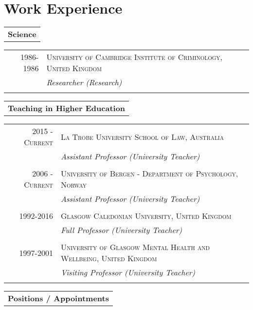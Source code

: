 \documentclass [a4paper,10pt]{article}
\begin{document}
\section{Work Experience}
\begin{tabular}{r}
\\\large
\textbf{Science}
\normalsize
\end{tabular}

\begin{tabular}{r|p{11cm}} 
\textsc{1986-1986} 
& \textsc{University of Cambridge Institute of Criminology, United Kingdom} \\ \textsc{} & \emph{Researcher (Research)}  \\ \multicolumn{2}{c}{} \\
\end{tabular}

\begin{tabular}{r}
\large
\textbf{Teaching in Higher Education}
\normalsize
\end{tabular}

\begin{tabular}{r|p{11cm}} 
\textsc{2015 - Current} 
& \textsc{La Trobe University School of Law, Australia} \\ \textsc{} & \emph{Assistant Professor (University Teacher)}  \\ \multicolumn{2}{c}{} \\
\textsc{2006 - Current} 
& \textsc{University of Bergen - Department of Psychology, Norway} \\ \textsc{} & \emph{Assistant Professor (University Teacher)}  \\ \multicolumn{2}{c}{} \\
\textsc{1992-2016} 
& \textsc{Glasgow Caledonian University, United Kingdom} \\ \textsc{} & \emph{Full Professor (University Teacher)}  \\ \multicolumn{2}{c}{} \\
\textsc{1997-2001} 
& \textsc{University of Glasgow Mental Health and Wellbeing, United Kingdom} \\ \textsc{} & \emph{Visiting Professor (University Teacher)}  \\ \multicolumn{2}{c}{} \\
\end{tabular}

\begin{tabular}{r}
\large
\textbf{Positions / Appointments}
\normalsize
\end{tabular}
\end{document}
